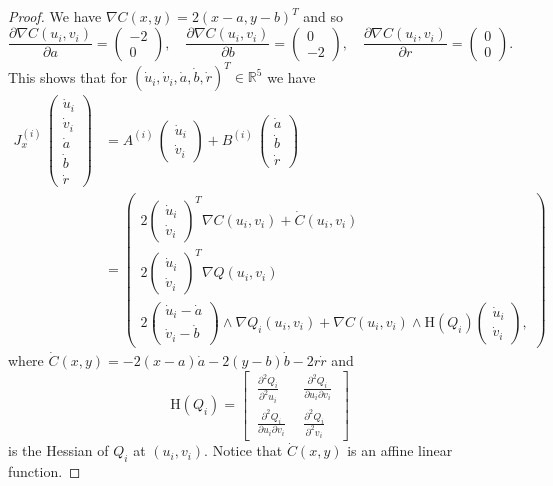 \documentclass[12pt]{amsart}
\theoremstyle{definition}
\theoremstyle{definition}
\numberwithin{equation}{section}
\begin{document}
\begin{proof}
We have $\nabla C(x,y) = 2(x-a,y-b)^T$ and so
$$\frac{\partial\nabla C(u_i,v_i)}{\partial a} =
\begin{pmatrix}
-2\\0
\end{pmatrix},\quad 
\frac{\partial\nabla C(u_i,v_i)}{\partial b} =
\begin{pmatrix}
    0\\-2
    \end{pmatrix},\quad 
\frac{\partial\nabla C(u_i,v_i)}{\partial r} = \begin{pmatrix}
    0\\0
    \end{pmatrix}.$$
This shows that for $(\dot u_i,
\dot v_i,
\dot a,
\dot b,
\dot r)^T \in\mathbb R^5$ we have 
\begin{align}\label{jacobian_eq}
J_x^{(i)} \,\begin{pmatrix}
\dot u_i\\
\dot v_i\\
\dot a\\
\dot b\\
\dot r
\end{pmatrix} &= A^{(i)} \,\begin{pmatrix}
\dot u_i\\
\dot v_i
\end{pmatrix} + B^{(i)} \,\begin{pmatrix}
    \dot a\\
    \dot b\\
    \dot r
    \end{pmatrix}\\
    &=
\begin{pmatrix}
2\begin{pmatrix}\dot u_i \\ \dot v_i \end{pmatrix}^T \nabla C(u_i,v_i) + \dot C(u_i,v_i)\\[0.3em]
2\begin{pmatrix}\dot u_i \\ \dot v_i \end{pmatrix}^T \nabla Q(u_i,v_i)\\[0.3em]
2\begin{pmatrix}\dot u_i - \dot a\\ \dot v_i - \dot b\end{pmatrix} \wedge \nabla Q_i(u_i,v_i) + \nabla C (u_i,v_i) \wedge \mathrm H(Q_i)\begin{pmatrix}\dot u_i \\ \dot v_i \end{pmatrix} ,
\end{pmatrix}\nonumber
\end{align}
where $\dot C(x,y) = -2(x-a)\dot a-2(y- b)\dot b - 2r\dot r$ and 
$$\mathrm H(Q_i) = \begin{bmatrix}
\ \frac{\partial^2 Q_i}{\partial^2 u_i}\ & \ \frac{\partial^2 Q_i}{\partial u_i\partial v_i}\ \\[0.5em]
\ \frac{\partial^2 Q_i}{\partial u_i\partial v_i}\ & \ \frac{\partial^2 Q_i}{\partial^2 v_i}\
\end{bmatrix}$$
is the Hessian of $Q_i$ at $(u_i,v_i)$. 
Notice that $\dot C(x,y)$ is an affine linear function.


\end{proof}
\end{document}
